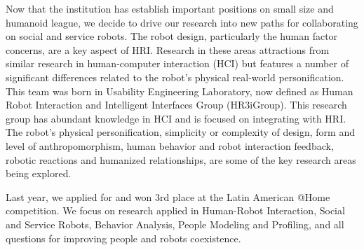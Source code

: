 Now that the institution has establish important positions on small size and humanoid league, we decide to drive our research into new paths for collaborating on social and service robots. The robot design, particularly the human factor concerns, are a key aspect of HRI. Research in these areas attractions from similar research in human-computer interaction (HCI) but features a number of significant differences related to the robot’s physical real-world personification. This team was born in Usability Engineering Laboratory, now defined as Human Robot Interaction and Intelligent Interfaces Group (HR3iGroup). This research group has abundant knowledge in HCI and is focused on integrating with HRI. The robot’s physical personification, simplicity or complexity of design, form and level of anthropomorphism, human behavior and robot interaction feedback, robotic reactions and humanized relationships, are some of the key research areas being explored.

Last year, we applied for and won 3rd place at the Latin American @Home competition. We focus on research applied in Human-Robot Interaction, Social and Service Robots, Behavior Analysis, People Modeling and Profiling, and all questions for improving people and robots coexistence.
